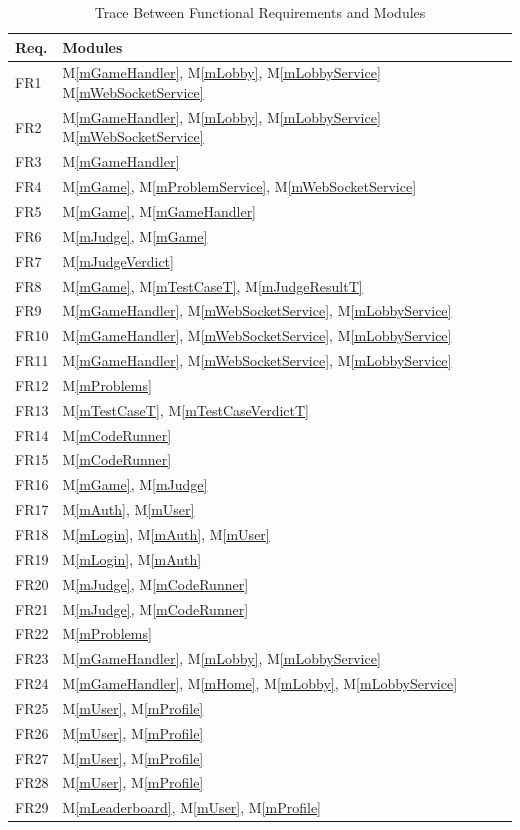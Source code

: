 \documentclass[12pt, titlepage]{article}
\newcommand{\mref}[1]{M\ref{#1}}
\begin{document}
\begin{table}[H]
\centering
\begin{tabular}{p{} p{}}
\toprule
\textbf{Req.} & \textbf{Modules}\\
\midrule
FR1 &  \mref{mGameHandler}, \mref{mLobby}, \mref{mLobbyService} \mref{mWebSocketService}\\
FR2 &  \mref{mGameHandler}, \mref{mLobby}, \mref{mLobbyService} \mref{mWebSocketService}\\
FR3 &  \mref{mGameHandler} \\
FR4 &  \mref{mGame}, \mref{mProblemService}, \mref{mWebSocketService}\\
FR5 &  \mref{mGame}, \mref{mGameHandler}\\
FR6 &  \mref{mJudge}, \mref{mGame} \\
FR7 &  \mref{mJudgeVerdict} \\
FR8 &  \mref{mGame}, \mref{mTestCaseT}, \mref{mJudgeResultT} \\
FR9 &  \mref{mGameHandler}, \mref{mWebSocketService}, \mref{mLobbyService} \\
FR10 & \mref{mGameHandler}, \mref{mWebSocketService}, \mref{mLobbyService} \\
FR11 & \mref{mGameHandler}, \mref{mWebSocketService}, \mref{mLobbyService} \\
FR12 & \mref{mProblems} \\
FR13 & \mref{mTestCaseT}, \mref{mTestCaseVerdictT}\\
FR14 & \mref{mCodeRunner} \\
FR15 & \mref{mCodeRunner} \\
FR16 & \mref{mGame}, \mref{mJudge} \\
FR17 & \mref{mAuth}, \mref{mUser}\\
FR18 & \mref{mLogin}, \mref{mAuth}, \mref{mUser}\\
FR19 & \mref{mLogin}, \mref{mAuth}\\
FR20 & \mref{mJudge}, \mref{mCodeRunner}\\
FR21 & \mref{mJudge}, \mref{mCodeRunner}\\
FR22 & \mref{mProblems}\\
FR23 & \mref{mGameHandler}, \mref{mLobby}, \mref{mLobbyService}\\
FR24 & \mref{mGameHandler}, \mref{mHome}, \mref{mLobby}, \mref{mLobbyService}\\
FR25 & \mref{mUser}, \mref{mProfile}\\
FR26 & \mref{mUser}, \mref{mProfile}\\
FR27 & \mref{mUser}, \mref{mProfile}\\
FR28 & \mref{mUser}, \mref{mProfile}\\
FR29 & \mref{mLeaderboard}, \mref{mUser}, \mref{mProfile}\\

\bottomrule
\end{tabular}
\caption{Trace Between Functional Requirements and Modules}
\label{TblRT}
\end{table}
\end{document}
